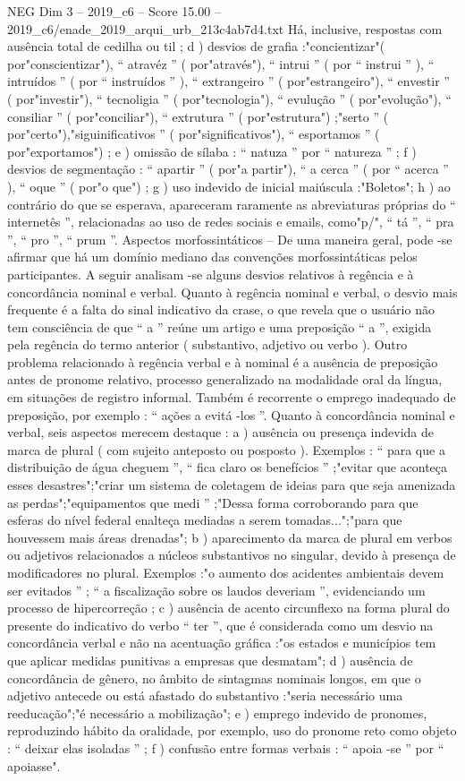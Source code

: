 \begin{textsample}{NEG Dim 3 – 2019\_c6 – Score 15.00 – 2019\_c6/enade\_2019\_arqui\_urb\_213c4ab7d4.txt}
Há, inclusive, respostas com ausência total de cedilha ou til ; d ) desvios de grafia :"concientizar"( por"conscientizar"), “ atravéz ” ( por"através"), “ intrui ” ( por “ instrui ” ), “ intruídos ” ( por “ instruídos ” ), “ extrangeiro ” ( por"estrangeiro"), “ envestir ” ( por"investir"), “ tecnoligia ” ( por"tecnologia"), “ evulução ” ( por"evolução"), “ consiliar ” ( por"conciliar"), “ extrutura ” ( por"estrutura") ;"serto ” ( por"certo"),"siguinificativos ” ( por"significativos"), “ esportamos ” ( por"exportamos") ; e ) omissão de sílaba : “ natuza ” por “ natureza ” ; f ) desvios de segmentação : “ apartir ” ( por"a partir"), “ a cerca ” ( por “ acerca ” ), “ oque ” ( por"o que") ; g ) uso indevido de inicial maiúscula :"Boletos"; h ) ao contrário do que se esperava, apareceram raramente as abreviaturas próprias do “ internetês ”, relacionadas ao uso de redes sociais e emails, como"p/", “ tá ”, “ pra ”, “ pro ”, “ prum ”.
Aspectos morfossintáticos – De uma maneira geral, pode -se afirmar que há um domínio mediano das convenções morfossintáticas pelos participantes.
A seguir analisam -se alguns desvios relativos à regência e à concordância nominal e verbal.
Quanto à regência nominal e verbal, o desvio mais frequente é a falta do sinal indicativo da crase, o que revela que o usuário não tem consciência de que “ a ” reúne um artigo e uma preposição “ a ”, exigida pela regência do termo anterior ( substantivo, adjetivo ou verbo ).
Outro problema relacionado à regência verbal e à nominal é a ausência de preposição antes de pronome relativo, processo generalizado na modalidade oral da língua, em situações de registro informal.
Também é recorrente o emprego inadequado de preposição, por exemplo : “ ações a evitá -los ”.
Quanto à concordância nominal e verbal, seis aspectos merecem destaque : a ) ausência ou presença indevida de marca de plural ( com sujeito anteposto ou posposto ).
Exemplos : “ para que a distribuição de água cheguem ”, “ fica claro os benefícios ” ;"evitar que aconteça esses desastres";"criar um sistema de coletagem de ideias para que seja amenizada as perdas";"equipamentos que medi ” ;"Dessa forma corroborando para que esferas do nível federal enalteça mediadas a serem tomadas...";"para que houvessem mais áreas drenadas"; b ) aparecimento da marca de plural em verbos ou adjetivos relacionados a núcleos substantivos no singular, devido à presença de modificadores no plural.
Exemplos :"o aumento dos acidentes ambientais devem ser evitados ” ; “ a fiscalização sobre os laudos deveriam ”, evidenciando um processo de hipercorreção ; c ) ausência de acento circunflexo na forma plural do presente do indicativo do verbo “ ter ”, que é considerada como um desvio na concordância verbal e não na acentuação gráfica :"os estados e municípios tem que aplicar medidas punitivas a empresas que desmatam"; d ) ausência de concordância de gênero, no âmbito de sintagmas nominais longos, em que o adjetivo antecede ou está afastado do substantivo :"seria necessário uma reeducação";"é necessário a mobilização"; e ) emprego indevido de pronomes, reproduzindo hábito da oralidade, por exemplo, uso do pronome reto como objeto : “ deixar elas isoladas ” ; f ) confusão entre formas verbais : “ apoia -se ” por “ apoiasse".

\end{textsample}
